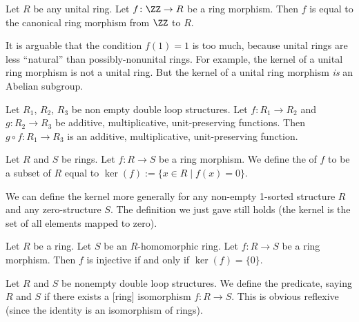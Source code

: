 \earmuffed
\begin{theorem}
Let $R$ be any unital ring.
Let $f\colon\ZZ\to R$ be a ring morphism.
Then $f$ is equal to the canonical ring morphism from $\ZZ$ to $R$.
\end{theorem}

\begin{remark}
It is arguable that the condition $f(1)=1$ is too much, because unital
rings are less ``natural'' than possibly-nonunital rings. For example,
the kernel of a unital ring morphism is not a unital ring. But the
kernel of a unital ring morphism \emph{is} an Abelian subgroup.
\end{remark}

\begin{theorem}
Let $R_{1}$, $R_{2}$, $R_{3}$ be non empty double loop structures.
Let $f\colon R_{1}\to R_{2}$ and $g\colon R_{2}\to R_{3}$ be additive,
multiplicative, unit-preserving functions. Then $g\circ f\colon R_{1}\to R_{3}$
is an additive, multiplicative, unit-preserving function.
\end{theorem}

\begin{definition}
Let $R$ and $S$ be rings. Let $f\colon R\to S$ be a ring morphism.
We define the  of $f$ to be a subset of $R$ equal to
$\ker(f):=\{x\in R\mid f(x)=0\}$.
\end{definition}

\begin{remark}
We can define the kernel more generally for any non-empty 1-sorted
structure $R$ and any zero-structure $S$. The definition we just gave
still holds (the kernel is the set of all elements mapped to zero).
\end{remark}

\begin{theorem}
Let $R$ be a ring. Let $S$ be an $R$-homomorphic ring.
Let $f\colon R\to S$ be a ring morphism.
Then $f$ is injective if and only if $\ker(f)=\{0\}$.
\end{theorem}

\begin{definition}
Let $R$ and $S$ be nonempty double loop structures.
We define the predicate, saying $R$ and $S$ 
if there exists a [ring] isomorphism $f\colon R\to S$.
This is obvious reflexive (since the identity is an isomorphism of rings).
\end{definition}

